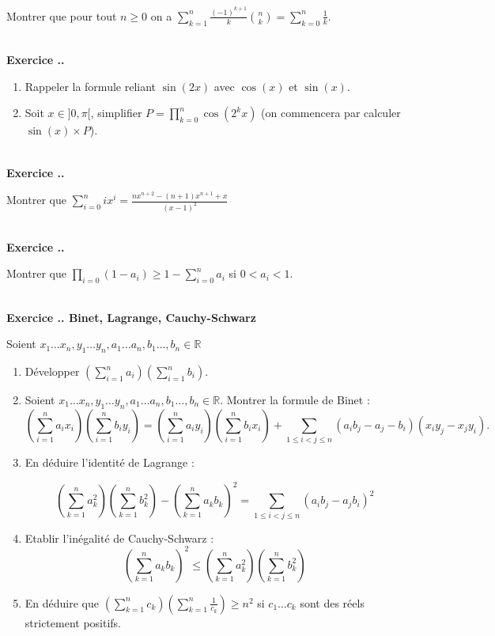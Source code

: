 \documentclass{article}
\newcommand{\mb}[1]{\mathbb{#1}}
\newcounter{exo}
\newcommand{\exercice}[1][\null]{\textbf{\\ \large Exercice \thesection.\theexo. \normalsize #1} \addtocounter{exo}{1}}
\begin{document}
Montrer que pour tout $n \ge 0$ on a $\displaystyle \sum_{k=1}^n \frac{(-1)^{k+1}}{k} {n \choose k} = \sum_{k=0}^n \frac{1}{k}$.


\exercice

\begin{enumerate}

\item Rappeler la formule reliant $\sin(2x)$ avec $\cos(x)$ et $\sin(x)$.

\item Soit $x \in ]0, \pi [$, simplifier $P =\displaystyle \prod_{k=0}^n \cos(2^k x)$ (on commencera par calculer $ \sin (x) \times P$).

\end{enumerate}


\exercice

Montrer que $\displaystyle \sum_{i=0}^n i x^i = \frac{n x^{n+2} - (n+1)x^{n+1} +x}{(x-1)^2}$

\exercice

Montrer que $\displaystyle \prod_{i=0}(1-a_i) \ge 1- \sum_{i=0}^n a_i$ si $0<a_i<1$.

\exercice[Binet, Lagrange, Cauchy-Schwarz]

Soient $x_1 \dots x_n, y_1 \dots y_n, a_1 \dots a_n, b_1 \dots, b_n \in \mb{R}$

\begin{enumerate}

\item Développer $\displaystyle \left(\sum_{i=1}^n a_i \right)\left(\sum_{i=1}^n b_i \right)$.

\item Soient $x_1 \dots x_n, y_1 \dots y_n, a_1 \dots a_n, b_1 \dots, b_n \in \mb{R}$. Montrer la formule de Binet :
$$ \left(\sum_{i=1}^n a_i x_i\right)\left(\sum_{i=1}^n b_i y_i\right) = \displaystyle \left(\sum_{i=1}^n a_i y_i\right)\left(\sum_{i=1}^n b_i x_i\right) + \sum_{1 \le i < j \le n} (a_i b_j - a_j -b_i)(x_i y_j - x_j y_i).$$

\item En déduire l'identité de Lagrange :

$$\displaystyle \left(\sum_{k=1}^n a_k^2\right)\left(\sum_{k=1}^n b_k^2\right) - \left(\sum_{k=1}^n a_k b_k\right)^2 = \sum_{1 \le i < j \le n} (a_i b_j - a_j b_i)^2$$


\item Etablir l'inégalité de Cauchy-Schwarz :
$$\displaystyle \left(\sum_{k=1}^n a_k b_k\right)^2 \le \left(\sum_{k=1}^n a_k^2\right)\left(\sum_{k=1}^n b_k^2\right)$$

\item En déduire que $ \displaystyle \left(\sum_{k=1}^n c_k\right)\left(\sum_{k=1}^n \frac{1}{c_k}\right) \ge n^2$ si $c_1 \dots c_k$ sont des réels strictement positifs.

\end{enumerate}
\end{document}
